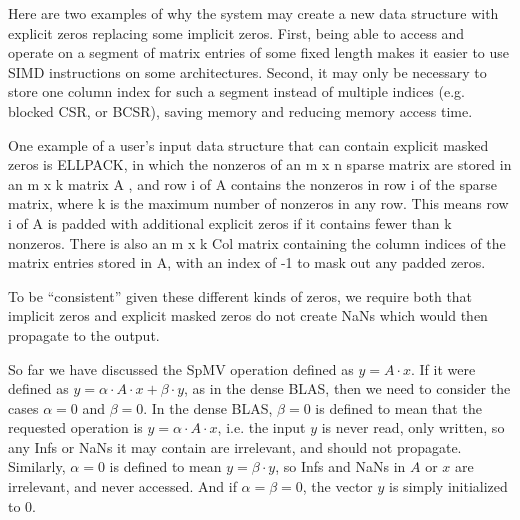 \documentclass{article}
\begin{document}
Here are two examples of why the system may create a new data structure with
explicit zeros replacing some implicit zeros. First, being able to access and
operate on a segment of matrix entries of some fixed length makes it easier to
use SIMD instructions on some architectures. Second, it may only be necessary
to store one column index for such a segment instead of multiple indices
(e.g. blocked CSR, or BCSR), saving memory and reducing memory access time.

One example of a user's input data structure that can contain explicit masked zeros is ELLPACK, 
in which the nonzeros of an m x n sparse matrix are stored in an m x k matrix A , and row i of A
contains the nonzeros in row i of the sparse matrix, where k is the maximum number of 
nonzeros in any row. This means row i of A is padded with additional explicit zeros if it contains
fewer than k nonzeros. There is also an m x k Col matrix containing the column indices of the
matrix entries stored in A, with an index of -1 to mask out any padded zeros.

\iffalse
Another example of explicit masked zeros is the BCSR format described above, augmented
with a bit-mask for each segment to indicate which zeros are implicit zeros, and so should 
not participate in any arithmetic operation (or if they do, that no NaNs are propagated).
Such a data structure could either be the user's input data structure, or created as a
performance optimization by the system.
\todo[inline]{[Spencer] Are we sure we want to use BCSR format augmented with a bitmask as an example here.  It is non standard and we discussed BSR or BCSR format being one where explicit zeros are actually added (modeling case 2).}

\todo[inline]{[Jim D.] I am open to
suggestions of other examples.}
\fi

To be ``consistent'' given these different kinds of zeros, we require both that
implicit zeros and explicit masked zeros do not create NaNs which would then
propagate to the output. 

So far we have discussed the SpMV operation defined as $y=A \cdot x$. 
If it were defined as $y = \alpha \cdot A \cdot x + \beta \cdot y$, as in the dense BLAS,
then we need to consider the cases $\alpha = 0$ and $\beta = 0$. In the dense BLAS,
$\beta = 0$ is defined to mean that the requested operation is $y = \alpha \cdot A \cdot x$,
i.e. the input $y$ is never read, only written, so any Infs or NaNs it may contain are
irrelevant, and should not propagate. Similarly, $\alpha = 0$ is defined to mean
$y = \beta \cdot y$, so Infs and NaNs in $A$ or $x$ are irrelevant, and never accessed.
And if $\alpha = \beta = 0$, the vector $y$ is simply initialized to 0.
\end{document}
